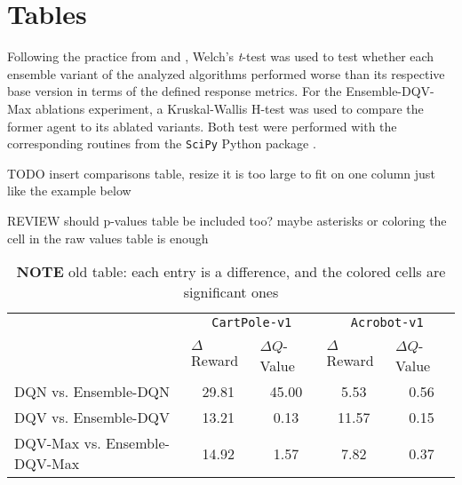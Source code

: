 \section{Tables}\label{sec:appendix_tables}
Following the practice from \citet{DBLP:journals/corr/abs-1709-06560}
and \citet{https://doi.org/10.48550/arxiv.1904.06979}, Welch's
\textit{t}-test was used to test whether each ensemble variant of the
analyzed algorithms performed worse than its respective base version
in terms of the defined response metrics.
For the Ensemble-DQV-Max ablations experiment, a Kruskal-Wallis H-test
was used to compare the former agent to its ablated variants.
Both test were performed with the corresponding routines from the
\texttt{SciPy} Python package \citep{2020SciPy-NMeth}.

TODO insert comparisons table, resize it is too large to fit on one
column just like the example below

REVIEW should p-values table be included too? maybe asterisks or
coloring the cell in the raw values table is enough

\begin{table}[h!]
\centering
\setlength{\extrarowheight}{0pt}
\addtolength{\extrarowheight}{\aboverulesep}
\addtolength{\extrarowheight}{\belowrulesep}
\setlength{\aboverulesep}{0pt}
\setlength{\belowrulesep}{0pt}
\caption{\textbf{NOTE} old table: each entry is a difference, and the
  colored cells are significant ones}\label{table:results_diff}
\begin{tabular}{lcccc}
\toprule
\multicolumn{1}{c}{\multirow{2}{*}{}} & \multicolumn{2}{c}{\texttt{CartPole-v1}}                                    & \multicolumn{2}{c}{\texttt{Acrobot-v1}}                                    \\
\cmidrule(l){2-5}
\multicolumn{1}{c}{}                  & \multicolumn{1}{l}{$\Delta$Reward}   & \multicolumn{1}{l}{$\Delta Q$-Value} & \multicolumn{1}{l}{$\Delta$Reward} & \multicolumn{1}{l}{$\Delta Q$-Value}  \\
\midrule
DQN vs. Ensemble-DQN                  & {\cellcolor[rgb]{1,0.988,0.62}}29.81 & {\cellcolor[rgb]{1,0.988,0.62}}45.00 & 5.53                               & 0.56                                  \\
\midrule
DQV vs. Ensemble-DQV                  & {\cellcolor[rgb]{1,0.988,0.62}}13.21 & 0.13                                 & 11.57                              & 0.15                                  \\
\midrule
DQV-Max vs. Ensemble-DQV-Max          & 14.92                                & 1.57                                 & 7.82                               & 0.37                                  \\
\bottomrule
\end{tabular}
\end{table}
